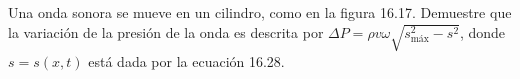 \item Una onda sonora se mueve en un cilindro, como en la figura 16.17. Demuestre que la variación de la presión de la onda es descrita por $\Delta P = \rho v \omega \sqrt{s_{\text{máx}}^2 - s^2}$, donde $s = s(x,t)$ está dada por la ecuación 16.28.